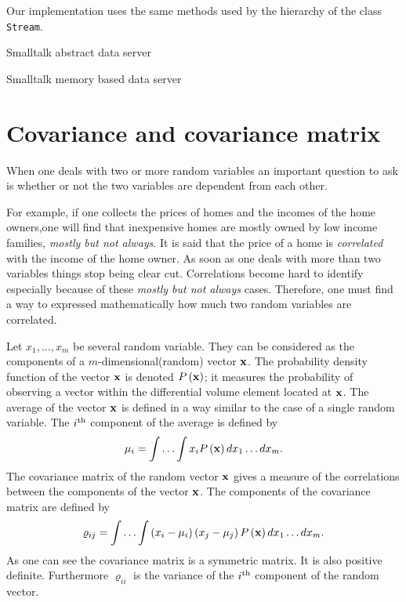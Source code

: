 \documentclass[twoside]{book}
\begin{document}
\noindent Our implementation uses the same methods used by the
hierarchy of the class {\tt Stream}.

\begin{listing} Smalltalk abstract data server \label{ls:abstractserver}

\end{listing}
\begin{listing} Smalltalk memory based data server \label{ls:memoryserver}

\end{listing}

\section{Covariance and covariance matrix}
\label{sec:covmatrix} When one deals with two or more random
variables an important question to ask is whether or not the two
variables are dependent from each other.

For example, if one collects the prices of homes and the incomes
of the home owners,one will find that inexpensive homes are mostly
owned by low income families, {\sl mostly but not always}. It is
said that the price of a home is {\sl correlated} with the income
of the home owner. As soon as one deals with more than two
variables things stop being clear cut. Correlations become hard to
identify especially because of these {\sl mostly but not always}
cases. Therefore, one must find a way to expressed mathematically
how much two random variables are correlated.

Let $x_1,\ldots,x_m$ be several random variable. They can be
considered as the components of a $m$-dimensional(random) vector
${\bf x}$. The probability density function of the vector ${\bf
x}$ is denoted $P\left({\bf x}\right)$; it measures the
probability of observing a vector within the differential volume
element located at ${\bf x}$. The average of the vector ${\bf x}$
is defined in a way similar to the case of a single random
variable. The $i^{\mathop{\rm th}}$ component of the average is defined by
\begin{equation}
 \mu_i=\int\ldots\int x_i P\left({\bf x}\right)dx_1\ldots dx_m.
\end{equation}
The covariance matrix of the random vector ${\bf x}$ gives a
measure of the correlations between the components of the vector
${\bf x}$. The components of the covariance matrix are defined by
\begin{equation}
 \varrho_{ij}=\int\ldots\int \left(x_i-\mu_i\right)\left(x_j-\mu_j\right)
  P\left({\bf x}\right)dx_1\ldots dx_m.
\end{equation}
As one can see the covariance matrix is a symmetric matrix. It is
also positive definite. Furthermore $\varrho_{ii}$ is the variance
of the $i^{\mathop{\rm th}}$ component of the random vector.
\end{document}
